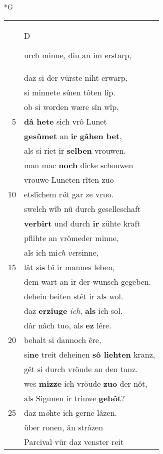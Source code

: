\documentclass[8pt,a4paper,notitlepage]{article}
\begin{document}
\newpage
\begin{table}[ht]
\begin{minipage}[t]{0.5\linewidth}
\small
\begin{center}*G
\end{center}
\begin{tabular}{rl}
 & \begin{large}D\end{large}urch minne, diu an im erstarp,\\ 
 & daz si der vürste niht erwarp,\\ 
 & si minnete s\textit{î}nen tôten lîp.\\ 
 & ob si worden wære sîn wîp,\\ 
5 & \textbf{dâ hete} sich vrô Lunet\\ 
 & \textbf{gesûmet} an \textbf{ir} \textbf{gâhen bet},\\ 
 & als si riet ir \textbf{selben} vrouwen.\\ 
 & man mac \textbf{noch} dicke schouwen\\ 
 & vrouwe Luneten rîten zuo\\ 
10 & etslîchem r\textit{â}t gar ze vruo.\\ 
 & swelch wîb nû durch geselleschaft\\ 
 & \textbf{verbirt} und durch \textbf{ir} zühte kraft\\ 
 & pflihte an vrömeder minne,\\ 
 & als ich mi\textit{ch} \textit{ve}rsinne,\\ 
15 & lât si\textbf{s} bî ir mannes leben,\\ 
 & dem wart an ir der wunsch gegeben.\\ 
 & dehein beiten stêt ir als wol.\\ 
 & daz \textbf{erziuge} \textit{ich}, \textbf{als} ich sol.\\ 
 & dâr nâch tuo, als \textbf{ez} lêre.\\ 
20 & behalt si dannoch êre,\\ 
 & si\textbf{ne} treit deheinen \textbf{sô liehten} kranz,\\ 
 & gêt si durch vröude an den tanz.\\ 
 & wes \textbf{mizze} ich vröude \textbf{zuo} der nôt,\\ 
 & als Sigunen ir triuwe \textbf{gebôt}?\\ 
25 & daz m\textit{ö}hte ich gerne lâzen.\\ 
 & über ronen, ân strâzen\\ 
 & Parcival vür daz venster reit\\ 

\end{tabular}
\end{minipage}
\end{table}
\end{document}
